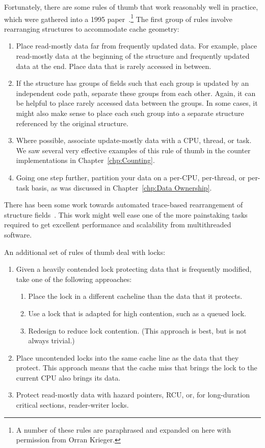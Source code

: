 Fortunately, there are some rules of thumb that work reasonably well in
practice, which were gathered into a 1995
paper~\cite{BenjaminGamsa95a}.\footnote{
	A number of these rules are paraphrased and expanded on here
	with permission from Orran Krieger.}
The first group of rules involve rearranging structures to accommodate
cache geometry:

\begin{enumerate}
\item	Place read-mostly data far from frequently updated data.
	For example, place read-mostly data at the beginning of the
	structure and frequently updated data at the end.
	Place data that is rarely accessed in between.
\item	If the structure has groups of fields such that each group is
	updated by an independent code path, separate these groups
	from each other.
	Again, it can be helpful to place rarely accessed data
	between the groups.
	In some cases, it might also make sense to place each such group
	into a separate structure referenced by the original structure.
\item	Where possible, associate update-mostly data with a CPU, thread,
	or task.
	We saw several very effective examples of this rule of thumb
	in the counter implementations in
	Chapter~\ref{chp:Counting}.
\item	Going one step further, partition your data on a per-CPU,
	per-thread, or per-task basis, as was discussed in
	Chapter~\ref{chp:Data Ownership}.
\end{enumerate}

There has been some work towards automated trace-based rearrangement
of structure
fields~\cite{Golovanevsky:2010:TDL:2174824.2174835}.
This work might well ease one of the more painstaking tasks
required to get excellent performance and scalability from
multithreaded software.

An additional set of rules of thumb deal with locks:

\begin{enumerate}
\item	Given a heavily contended lock protecting data that is
	frequently modified, take one of the following approaches:
	\begin{enumerate}
	\item	Place the lock in a different cacheline than the data
		that it protects.
	\item	Use a lock that is adapted for high contention, such
		as a queued lock.
	\item	Redesign to reduce lock contention.
		(This approach is best, but is not always trivial.)
	\end{enumerate}
\item	Place uncontended locks into the same cache line as the data
	that they protect.
	This approach means that the cache miss that brings the
	lock to the current CPU also brings its data.
\item	Protect read-mostly data with hazard pointers, RCU, or, for
	long-duration critical sections, reader-writer locks.
\end{enumerate}

